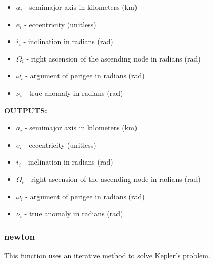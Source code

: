\documentclass[11pt, reqno]{article}    %
\begin{document}
\begin{itemize}
    \item \( a_i \)  - semimajor axis in kilometers (\si{\kilo\meter})
    \item \( e_i \) - eccentricity (unitless)
    \item \( i_i \) - inclination in radians (\si{\radian})
    \item \( \Omega_i \) - right ascension of the ascending node in radians (\si{\radian})
    \item \( \omega_i \) - argument of perigee in radians (\si{\radian})
    \item \( \nu_i \) - true anomaly in radians (\si{\radian})
\end{itemize}

\noindent \textbf{OUTPUTS:}
\begin{itemize}
    \item \( a_i \)  - semimajor axis in kilometers (\si{\kilo\meter})
    \item \( e_i \) - eccentricity (unitless)
    \item \( i_i \) - inclination in radians (\si{\radian})
    \item \( \Omega_i \) - right ascension of the ascending node in radians (\si{\radian})
    \item \( \omega_i \) - argument of perigee in radians (\si{\radian})
    \item \( \nu_i \) - true anomaly in radians (\si{\radian})
\end{itemize}

\subsubsection*{newton}

This function uses an iterative method to solve Kepler's problem.
\end{document}
